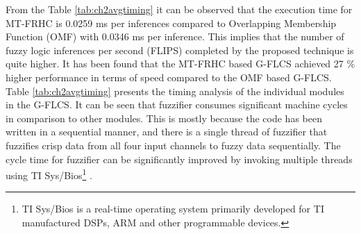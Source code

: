 From the Table \ref{tab:ch2avgtiming} it can be observed that the execution time for MT-FRHC is 0.0259 ms per inferences compared to Overlapping Membership Function (OMF) with 0.0346 ms per inference. This implies that the number of fuzzy logic inferences per second (FLIPS) completed by the proposed technique is quite higher. It has been found that the MT-FRHC based G-FLCS achieved 27 \% higher performance in terms of speed compared to the OMF based G-FLCS. Table \ref{tab:ch2avgtiming} presents the timing analysis of the individual modules in the G-FLCS. It can be seen that fuzzifier consumes significant machine cycles in comparison to other modules. This is mostly because the code has been written in a sequential manner, and there is a single thread of fuzzifier that fuzzifies crisp data from all four input channels to fuzzy data sequentially. The cycle time for fuzzifier can be significantly improved by invoking multiple threads using TI Sys/Bios\footnote{TI Sys/Bios is a real-time operating system primarily developed for TI manufactured DSPs, ARM and other programmable devices.} . 

\begin{table}[h]
	\centering
	\caption{Hardware Implementation: Average Time Response}
	\label{tab:ch2avgtiming}
\end{table}


